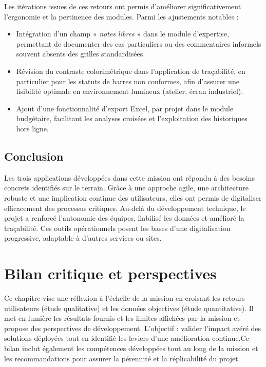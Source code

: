 \documentclass[11pt,a4paper]{article}
\begin{document}
Les itérations issues de ces retours ont permis d’améliorer significativement l’ergonomie et la pertinence des modules. Parmi les ajustements notables :

\begin{itemize}
    \item Intégration d’un champ « \textit{notes libres} » dans le module d’expertise, permettant de documenter des cas particuliers ou des commentaires informels souvent absents des grilles standardisées.
    
    \item Révision du contraste colorimétrique dans l’application de traçabilité, en particulier pour les statuts de barres non conformes, afin d’assurer une lisibilité optimale en environnement lumineux (atelier, écran industriel).
    
    \item Ajout d’une fonctionnalité d’export Excel, par projet dans le module budgétaire, facilitant les analyses croisées et l’exploitation des historiques hors ligne.
\end{itemize}

\subsection{Conclusion}

Les trois applications développées dans cette mission ont répondu à des besoins concrets identifiés sur le terrain. Grâce à une approche agile, une architecture robuste et une implication continue des utilisateurs, elles ont permis de digitaliser efficacement des processus critiques. Au-delà du développement technique, le projet a renforcé l’autonomie des équipes, fiabilisé les données et amélioré la traçabilité. Ces outils opérationnels posent les bases d’une digitalisation progressive, adaptable à d’autres services ou sites.


\newpage
\section{Bilan critique et perspectives}

Ce chapitre vise une réflexion à l’échelle de la mission en croisant les retours utilisateurs (étude qualitative) et les données objectives (étude quantitative). Il met en lumière les résultats fournis et les limites affichées par la mission et propose des perspectives de développement. L’objectif : valider l’impact avéré des solutions déployées tout en identifié les leviers d’une amélioration continue.Ce bilan inclut également les compétences développées tout au long de la mission et les recommandations pour assurer la pérennité et la réplicabilité du projet.
\end{document}
